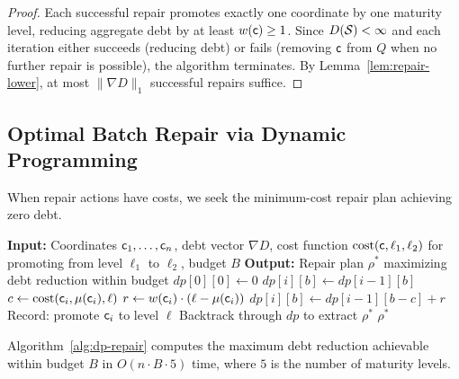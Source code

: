 \documentclass[11pt]{article}
\begin{document}
\begin{proof}
Each successful repair promotes exactly one coordinate by one
maturity level, reducing aggregate debt by at least $w(\mathsf{c}) \geq 1$.
Since $D(\mathcal{S}) < \infty$ and each iteration either succeeds
(reducing debt) or fails (removing $\mathsf{c}$ from $Q$ when no
further repair is possible), the algorithm terminates.
By Lemma~\ref{lem:repair-lower}, at most $\|\nabla D\|_1$
successful repairs suffice.
\end{proof}

\subsection{Optimal Batch Repair via Dynamic Programming}%
\label{subsec:dp-repair}

When repair actions have costs, we seek the minimum-cost repair plan
achieving zero debt.

\begin{algorithm}[H]
\caption{Optimal Batch Repair (Dynamic Programming)}
\label{alg:dp-repair}
\begin{algorithmic}[1]
\STATE \textbf{Input:} Coordinates $\mathsf{c}_1, \ldots, \mathsf{c}_n$,
  debt vector $\nabla D$, cost function
  $\text{cost}(\mathsf{c}, \ell_1, \ell_2)$ for promoting from level
  $\ell_1$ to $\ell_2$, budget $B$
\STATE \textbf{Output:} Repair plan $\rho^*$ maximizing debt
  reduction within budget
\STATE $\textit{dp}[0][0] \gets 0$ 
    \STATE $\textit{dp}[i][b] \gets \textit{dp}[i-1][b]$
      \STATE $c \gets \text{cost}(\mathsf{c}_i, \mu(\mathsf{c}_i), \ell)$
      \STATE $r \gets w(\mathsf{c}_i) \cdot (\ell - \mu(\mathsf{c}_i))$
        \STATE $\textit{dp}[i][b] \gets
          \textit{dp}[i-1][b-c] + r$
        \STATE Record: promote $\mathsf{c}_i$ to level $\ell$
      \ENDIF
    \ENDFOR
  \ENDFOR
\ENDFOR
\STATE Backtrack through $\textit{dp}$ to extract $\rho^*$
\RETURN $\rho^*$
\end{algorithmic}
\end{algorithm}

\begin{theorem}[DP Optimality]\label{thm:dp-optimal}
Algorithm~\ref{alg:dp-repair} computes the maximum debt reduction
achievable within budget $B$ in $O(n \cdot B \cdot 5)$ time, where
$5$ is the number of maturity levels.
\end{theorem}
\end{document}

